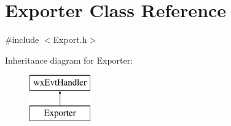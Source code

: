 \hypertarget{class_exporter}{}\section{Exporter Class Reference}
\label{class_exporter}


{\ttfamily \#include $<$Export.\+h$>$}

Inheritance diagram for Exporter\+:\begin{figure}[H]
\begin{center}
\leavevmode
\includegraphics[height=2.000000cm]{class_exporter}
\end{center}
\end{figure}
